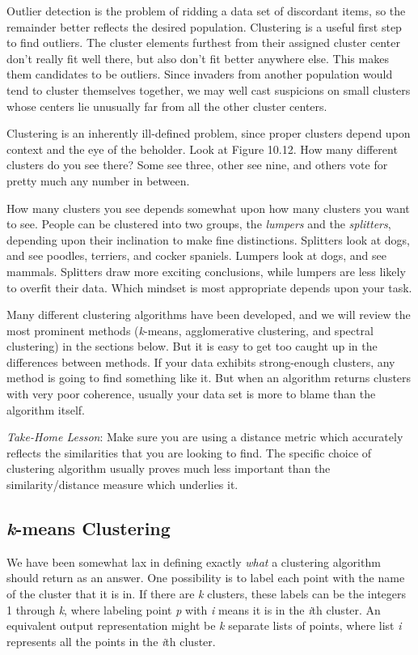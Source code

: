 \documentclass[10pt]{article}
\begin{document}
Outlier detection is the problem of ridding a data set of discordant items, so the remainder better reflects the desired population. Clustering is a useful first step to find outliers. The cluster elements furthest from their assigned cluster center don't really fit well there, but also don't fit better anywhere else. This makes them candidates to be outliers. Since invaders from another population would tend to cluster themselves together, we may well cast suspicions on small clusters whose centers lie unusually far from all the other cluster centers.

Clustering is an inherently ill-defined problem, since proper clusters depend upon context and the eye of the beholder. Look at Figure 10.12. How many different clusters do you see there? Some see three, other see nine, and others vote for pretty much any number in between.

How many clusters you see depends somewhat upon how many clusters you want to see. People can be clustered into two groups, the \textit{lumpers} and the \textit{splitters}, depending upon their inclination to make fine distinctions. Splitters look at dogs, and see poodles, terriers, and cocker spaniels. Lumpers look at dogs, and see mammals. Splitters draw more exciting conclusions, while lumpers are less likely to overfit their data. Which mindset is most appropriate depends upon your task.

Many different clustering algorithms have been developed, and we will review the most prominent methods (\textit{k}-means, agglomerative clustering, and spectral clustering) in the sections below. But it is easy to get too caught up in the differences between methods. If your data exhibits strong-enough clusters, any method is going to find something like it. But when an algorithm returns clusters with very poor coherence, usually your data set is more to blame than the algorithm itself.

\textit{Take-Home Lesson}: Make sure you are using a distance metric which accurately reflects the similarities that you are looking to find. The specific choice of clustering algorithm usually proves much less important than the similarity/distance measure which underlies it.

\subsection{\textit{k}-means Clustering}
We have been somewhat lax in defining exactly \textit{what} a clustering algorithm should return as an answer. One possibility is to label each point with the name of the cluster that it is in. If there are \textit{k} clusters, these labels can be the integers 1 through \textit{k}, where labeling point \textit{p} with \textit{i} means it is in the \textit{i}th cluster. An equivalent output representation might be \textit{k} separate lists of points, where list \textit{i} represents all the points in the \textit{i}th cluster.
\end{document}

